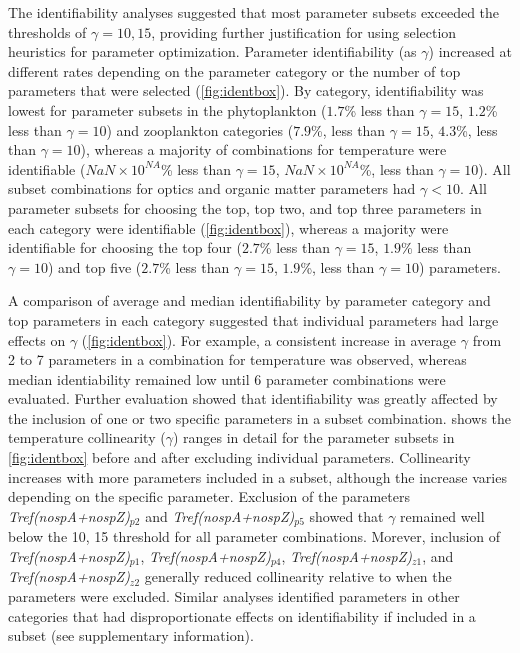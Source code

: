 \documentclass[letterpaper,12pt,oneside]{article}\usepackage[]{graphicx}\usepackage[]{color}
\begin{document}
The identifiability analyses suggested that most parameter subsets exceeded the thresholds of $\gamma = 10, 15$, providing further justification for using selection heuristics for parameter optimization.  Parameter identifiability (as $\gamma$) increased at different rates depending on the parameter category or the number of top parameters that were selected (\cref{fig:identbox}).  By category, identifiability was lowest for parameter subsets in the phytoplankton ($1.7$\% less than $\gamma = 15$, $1.2$\% less than $\gamma = 10$)  and zooplankton categories ($7.9$\%, less than $\gamma = 15$, $4.3$\%, less than $\gamma = 10$), whereas a majority of combinations for temperature were identifiable ($NaN\times 10^{NA}$\% less than $\gamma = 15$, $NaN\times 10^{NA}$\%, less than $\gamma = 10$).  All subset combinations for optics and organic matter parameters had $\gamma < 10$.  All parameter subsets for choosing the top, top two, and top three parameters in each category were identifiable (\cref{fig:identbox}), whereas a majority were identifiable for choosing the top four ($2.7$\% less than $\gamma = 15$, $1.9$\% less than $\gamma = 10$) and top five ($2.7$\% less than $\gamma = 15$, $1.9$\%, less than $\gamma = 10$) parameters.  



A comparison of average and median identifiability by parameter category and top parameters in each category suggested that individual parameters had large effects on $\gamma$ (\cref{fig:identbox}).  For example, a consistent increase in average $\gamma$ from 2 to 7 parameters in a combination for temperature was observed, whereas median identiability remained low until 6 parameter combinations were evaluated.  Further evaluation showed that identifiability was greatly affected by the inclusion of one or two specific parameters in a subset combination.   shows the temperature collinearity ($\gamma$) ranges in detail for the parameter subsets in \cref{fig:identbox} before and after excluding individual parameters.  Collinearity increases with more parameters included in a subset, although the increase varies depending on the specific parameter.  Exclusion of the parameters \textit{Tref(nospA+nospZ)$_{p2}$} and \textit{Tref(nospA+nospZ)$_{p5}$} showed that $\gamma$ remained well below the 10, 15 threshold for all parameter combinations.  Morever, inclusion of \textit{Tref(nospA+nospZ)$_{p1}$}, \textit{Tref(nospA+nospZ)$_{p4}$}, \textit{Tref(nospA+nospZ)$_{z1}$}, and \textit{Tref(nospA+nospZ)$_{z2}$} generally reduced collinearity relative to when the parameters were excluded.  Similar analyses identified parameters in other categories that had disproportionate effects on identifiability if included in a subset (see supplementary information).
\end{document}
